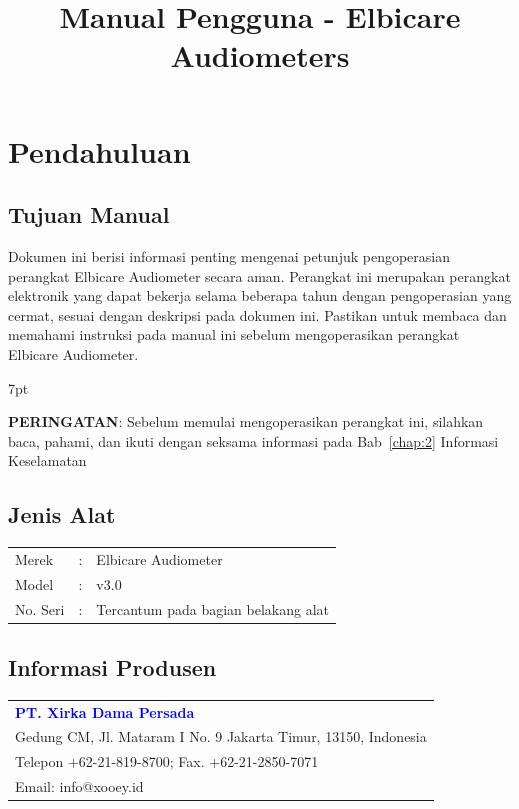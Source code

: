 \documentclass[11pt,a4paper,twoside,draft,onecolumn]{book}
\title{Manual Pengguna - Elbicare Audiometers}
\newenvironment{formalred}{%
	\def\FrameCommand{%
		\hspace{1pt}%
		{\color{red}\vrule width 2pt}%
		{\color{formalshade}\vrule width 4pt}%
		\colorbox{formalshade}%
	}%
	\MakeFramed{\advance\hsize-\width\FrameRestore}%
	\noindent\hspace{-4.55pt}%
	\begin{adjustwidth}{}{7pt}%
		\vspace{2pt}\vspace{2pt}%
	}
	{%
		\vspace{2pt}\end{adjustwidth}\endMakeFramed%
}
\begin{document}
	
	\maketitle
	\renewcommand\contentsname{Daftar Isi}
	\tableofcontents
	
	\renewcommand\listfigurename{Daftar Gambar}
	\listoffigures
	
	\renewcommand\listtablename{Daftar Tabel}
	\listoftables
	\newpage
	
	\renewcommand\chaptername{Bab}
	
	\chapter{Pendahuluan}
		\section{Tujuan Manual}
		Dokumen ini berisi informasi penting mengenai petunjuk pengoperasian perangkat Elbicare Audiometer secara aman. Perangkat ini merupakan perangkat elektronik yang dapat bekerja selama beberapa tahun dengan pengoperasian yang cermat, sesuai dengan deskripsi pada dokumen ini. Pastikan untuk membaca dan memahami instruksi pada manual ini sebelum mengoperasikan perangkat Elbicare Audiometer. 
		
		\begin{formalred}
			\raisebox{0.325ex}{\resizebox{!}{2ex}{\danger}} \textbf{PERINGATAN}:
			Sebelum memulai mengoperasikan perangkat ini, silahkan baca, pahami, dan ikuti dengan seksama informasi pada Bab~\ref{chap:2} Informasi Keselamatan 
		\end{formalred}
		
		\section{Jenis Alat}
		\begin{tabular}{lcl}
			Merek & : & Elbicare Audiometer\\
			Model & : & v3.0\\
			No. Seri & : & Tercantum pada bagian belakang alat\\
		\end{tabular}
		
		\section{Informasi Produsen}
		\begin{tabular}{l}
			\textbf{\textcolor{blue}{PT. Xirka Dama Persada}}\\
			Gedung CM, Jl. Mataram I No. 9 Jakarta Timur, 13150, Indonesia\\
			Telepon +62-21-819-8700; Fax. +62-21-2850-7071\\
			Email: info@xooey.id\\
		\end{tabular}
		
\end{document}
